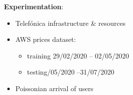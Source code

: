 \documentclass[aspectratio=169]{beamer}
\begin{document}
\begin{frame}
    \frametitle{\secname}
    \framesubtitle{\subsecname}

    \textbf{Experimentation}:
    \begin{itemize}
        \item Telefónica infrastructure \& resources~\cite{tid}\pause
        \item AWS prices dataset:
            \begin{itemize}
                \item training 29/02/2020 -- 02/05/2020
                \item testing/05/2020 --31/07/2020
            \end{itemize}\pause
        \item Poissonian arrival of users
    \end{itemize}
\end{frame}
\end{document}
